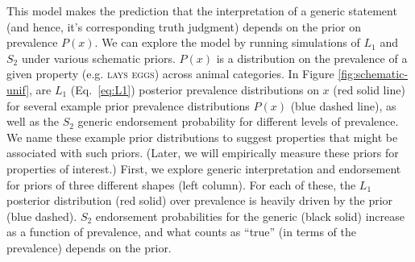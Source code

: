 \documentclass[12pt,letterpaper]{article}
\begin{document}
This model makes the prediction that the interpretation of a generic statement (and hence, it's corresponding truth judgment) depends on the prior on prevalence $P(x)$.
We can explore the model by running simulations of $L_1$ and $S_2$ under various schematic priors.
$P(x)$ is a distribution on the prevalence of a given property (e.g. \textsc{lays eggs}) across animal categories. 
In Figure \ref{fig:schematic-unif}, are $L_1$ (Eq.~\ref{eq:L1}) posterior prevalence distributions on $x$ (red solid line) for several example prior prevalence distributions $P(x)$ (blue dashed line), as well as the $S_2$ generic endorsement probability for different levels of prevalence.
We name these example prior distributions to suggest properties that might be associated with such priors. 
(Later, we will empirically measure these priors for properties of interest.)
First, we explore generic interpretation and endorsement for priors of three different shapes (left column). 
For each of these, the $L_1$ posterior distribution (red solid) over prevalence is heavily driven by the prior (blue dashed).
$S_2$ endorsement probabilities for the generic (black solid) increase as a function of prevalence, and what counts as ``true'' (in terms of the prevalence) depends on the prior. 
\end{document}
